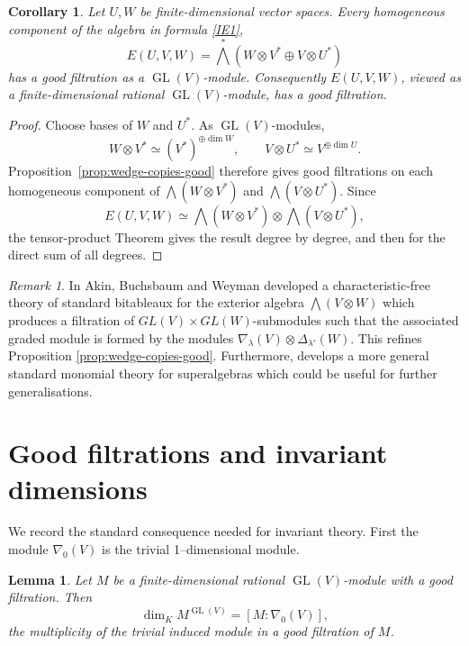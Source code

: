\documentclass[10pt]{amsart}
\newtheorem{corollary}[theorem]{Corollary}
\newtheorem{lemma}[theorem]{Lemma}
\theoremstyle{definition}
\theoremstyle{remark}
\newtheorem{remark}[theorem]{Remark}
\newcommand{\GL}{\operatorname{GL}}
\begin{document}
\begin{corollary}\label{cor:mixed-exterior-good}
Let $U,W$ be finite-dimensional vector spaces. Every homogeneous component
of the algebra in formula \eqref{IE1},
\[
E(U,V,W)=
\bigwedge^*\!\left(W\otimes V^*\oplus V\otimes U^*\right)
\]
has a good filtration as a $\GL(V)$-module. Consequently $E(U,V,W)$, viewed as
a finite-dimensional rational $\GL(V)$-module, has a good filtration.
\end{corollary}

\begin{proof}
Choose bases of $W$ and $U^*$. As $\GL(V)$-modules,
\[
W\otimes V^*\simeq (V^*)^{\oplus \dim W},
\qquad
V\otimes U^*\simeq V^{\oplus \dim U}.
\]
Proposition~\ref{prop:wedge-copies-good} therefore gives good filtrations on
each homogeneous component of
$\bigwedge(W\otimes V^*)$ and $\bigwedge(V\otimes U^*)$. Since
\[
E(U,V,W)
\simeq
\bigwedge(W\otimes V^*)\otimes
\bigwedge(V\otimes U^*),
\]
the tensor-product Theorem gives the result degree by degree, and then for
the direct sum of all degrees.
\end{proof}

\begin{remark}\label{abw-filtration}
In \cite{ABW}  Akin, Buchsbaum and Weyman developed a characteristic-free theory of standard bitableaux for the exterior algebra $\bigwedge (V\otimes W)$ which produces a filtration of $GL(V)\times GL(W)$-submodules  such that the  associated graded module  is formed  by the modules $\nabla_\lambda(V)\otimes \Delta_{\lambda'}(W)$. This refines  Proposition  \ref{prop:wedge-copies-good}. Furthermore, \cite{GrosshansRotaStein}  develops a more general  standard monomial theory for superalgebras  which could be useful for further generalisations.\end{remark}
 

 \section{Good filtrations and invariant dimensions}
\label{sec:good-filtration-invariants}

We record the standard consequence needed for invariant theory.  First the module $\nabla_0(V)$  is the trivial 1--dimensional module.



\begin{lemma}\label{lem:invariants-good-filtration}
Let $M$ be a finite-dimensional rational $\GL(V)$-module with a good filtration.
Then
\[
\dim_K M^{\GL(V)}=[M:\nabla_0(V)],
\]
the multiplicity of the trivial induced module in a good filtration of $M$.
\end{lemma}
\end{document}
